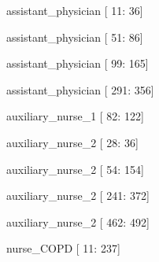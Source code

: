 \documentclass[12pt,a4paper,oneside]{article}
\begin{document}
\begin{itemize}
{ \item assistant\_physician [  11:  36] }%
{ \item assistant\_physician [  51:  86] }%
{ \item assistant\_physician [  99: 165] }%
{ \item assistant\_physician [ 291: 356] }%
{ \item auxiliary\_nurse\_1 [  82: 122] }%
{ \item auxiliary\_nurse\_2 [  28:  36] }%
{ \item auxiliary\_nurse\_2 [  54: 154] }%
{ \item auxiliary\_nurse\_2 [ 241: 372] }%
{ \item auxiliary\_nurse\_2 [ 462: 492] }%
{ \item nurse\_COPD [  11: 237] }%

\end{itemize}
\end{document}
